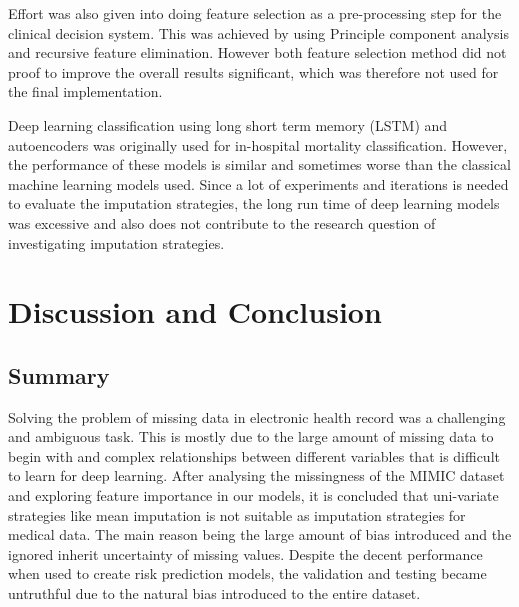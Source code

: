 \documentclass{l4proj}
\begin{document}
Effort was also given into doing feature selection as a pre-processing step for the clinical decision system. This was achieved by using Principle component analysis and recursive feature elimination. However both feature selection method did not proof to improve the overall results significant, which was therefore not used for the final implementation. 

Deep learning classification using long short term memory (LSTM) and autoencoders was originally used for in-hospital mortality classification. However, the performance of these models is similar and sometimes worse than the classical machine learning models used. Since a lot of experiments and iterations is needed to evaluate the imputation strategies, the long run time of deep learning models was excessive and also does not contribute to the research question of investigating imputation strategies.



\chapter{Discussion and Conclusion}    

\section{Summary}

Solving the problem of missing data in electronic health record was a challenging and ambiguous task. This is mostly due to the large amount of missing data to begin with and complex relationships between different variables that is difficult to learn for deep learning. After analysing the missingness of the MIMIC dataset and exploring feature importance in our models, it is concluded that uni-variate strategies like mean imputation is not suitable as imputation strategies for medical data. The main reason being the large amount of bias introduced and the ignored inherit uncertainty of missing values. Despite the decent performance when used to create risk prediction models, the validation and testing became untruthful due to the natural bias introduced to the entire dataset.
\end{document}
